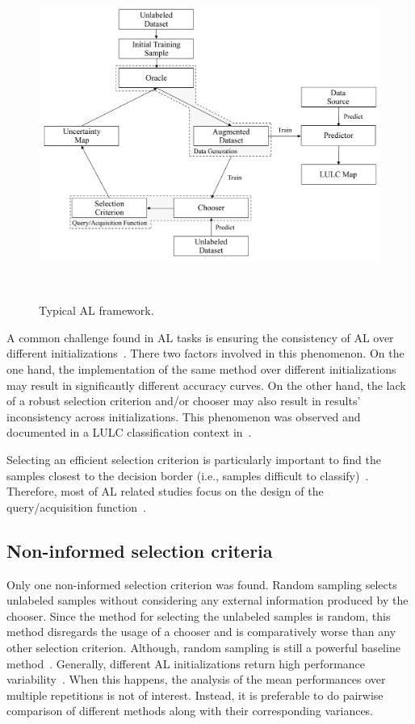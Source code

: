 \documentclass[parskip=full]{scrartcl}
\begin{document}
\begin{figure}[htb]
	\centering
	\includegraphics[width=.85\linewidth]{../analysis/al_typical}
	\caption{Typical AL framework.
    }~\label{fig:al_typical}
\end{figure}

A common challenge found in AL tasks is ensuring the consistency of AL over
different initializations~\cite{Kottke2017}. There two factors involved in this
phenomenon. On the one hand, the implementation of the same method over
different initializations may result in significantly different accuracy curves.
On the other hand, the lack of a robust selection criterion and/or chooser may
also result in results' inconsistency across initializations. This phenomenon
was observed and documented in a LULC classification context
in~\cite{tuia2011using}.

Selecting an efficient selection criterion is particularly important to find the
samples closest to the decision border (i.e., samples difficult to
classify)~\cite{Shrivastava2021}. Therefore, most of AL related studies focus on
the design of the query/acquisition function~\cite{Su2020}.

\subsection{Non-informed selection criteria}

Only one non-informed selection criterion was found. Random sampling selects
unlabeled samples without considering any external information produced by the
chooser. Since the method for selecting the unlabeled samples is random, this
method disregards the usage of a chooser and is comparatively worse than any
other selection criterion. Although, random sampling is still a powerful
baseline method~\cite{Cawley2011}. Generally, different AL initializations
return high performance variability~\cite{Kottke2017}. When this happens, the
analysis of the mean performances over multiple repetitions is not of interest.
Instead, it is preferable to do pairwise comparison of different methods along
with their corresponding variances. 
\end{document}
